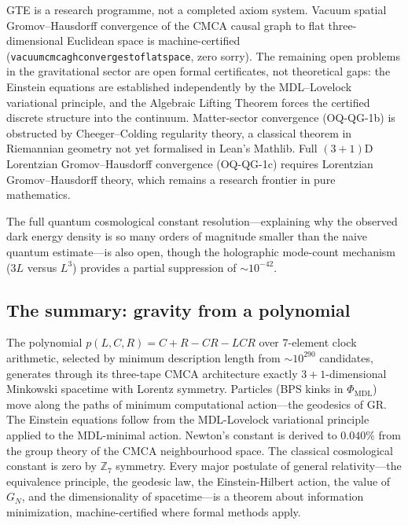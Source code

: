 \documentclass[11pt,a4paper]{article}
\newcommand{\lean}[1]{\begingroup\def\_{\textunderscore\allowbreak}\texttt{#1}\endgroup}
\newcommand{\GN}{G_{\!N}}
\newcommand{\PHIMDL}{\Phi_{\mathrm{MDL}}}
\newcommand{\ZS}{\mathbb{Z}_7}
\begin{document}
GTE is a research programme, not a completed axiom system.  Vacuum spatial
Gromov--Hausdorff convergence of the CMCA causal graph to flat three-dimensional
Euclidean space is machine-certified (\lean{vacuum\_cmca\_gh\_converges\_to\_flat\_space},
zero sorry). The remaining open problems in the gravitational sector are open formal
certificates, not theoretical gaps: the Einstein equations are established
independently by the MDL--Lovelock variational principle, and the Algebraic
Lifting Theorem forces the certified discrete structure into the continuum.
Matter-sector convergence (OQ-QG-1b) is obstructed by Cheeger--Colding
regularity theory, a classical theorem in Riemannian geometry not yet
formalised in Lean's Mathlib.  Full $(3{+}1)$D Lorentzian Gromov--Hausdorff
convergence (OQ-QG-1c) requires Lorentzian Gromov--Hausdorff theory, which
remains a research frontier in pure mathematics.

The full quantum cosmological constant resolution---explaining why the observed
dark energy density is so many orders of magnitude smaller than the naive quantum
estimate---is also open, though the holographic mode-count mechanism ($3L$ versus
$L^3$) provides a partial suppression of $\sim 10^{-42}$.

\subsection{The summary: gravity from a polynomial}

\begin{tcolorbox}[colback=boxblue,colframe=blue!40!black,
  title=One-paragraph summary of the gravity derivation]
The polynomial $p(L,C,R) = C + R - CR - LCR$ over 7-element clock arithmetic,
selected by minimum description length from $\sim 10^{290}$ candidates, generates
through its three-tape CMCA architecture exactly $3{+}1$-dimensional Minkowski
spacetime with Lorentz symmetry.  Particles (BPS kinks in $\PHIMDL$) move along
the paths of minimum computational action---the geodesics of GR.  The Einstein
equations follow from the MDL-Lovelock variational principle applied to the
MDL-minimal action.  Newton's constant is derived to $0.040\%$ from the
group theory of the CMCA neighbourhood space.  The classical cosmological constant
is zero by $\ZS$ symmetry.  Every major postulate of general relativity---the
equivalence principle, the geodesic law, the Einstein-Hilbert action, the value of
$\GN$, and the dimensionality of spacetime---is a theorem about information
minimization, machine-certified where formal methods apply.
\end{tcolorbox}
\end{document}
